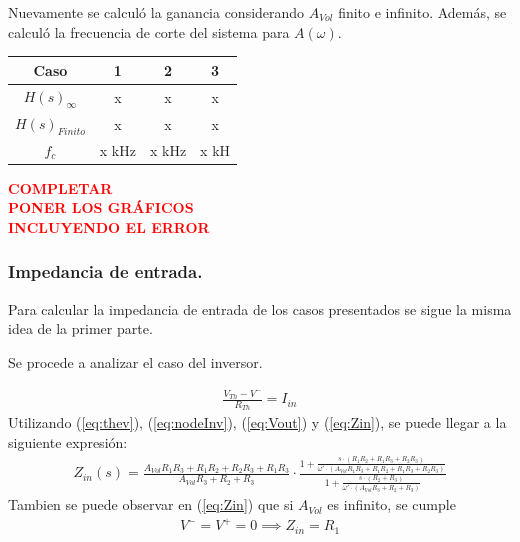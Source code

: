 Nuevamente se calculó la ganancia considerando $A_{Vol}$ finito e infinito. Además, se calculó la frecuencia de corte del sistema para $A(\omega)$.

\begin{table}[H]
\begin{center}
\begin{tabular}{|c|c|c|c|}
\hline
\textbf{Caso}            & \textbf{1} & \textbf{2} & \textbf{3} \\ \hline
\textbf{$H(s)_{\infty}$} & x         & x          & x        \\ \hline
\textbf{$H(s)_{Finito}$} & x     & x     & x     \\ \hline
\textbf{$f_c$}           & x kHz   & x kHz  & x kH     \\ \hline
\end{tabular}
\end{center}
\end{table}

\begin{center}
\textcolor{red}{\textbf{COMPLETAR}}\\
\textcolor{red}{\textbf{PONER LOS GRÁFICOS}}\\
\textcolor{red}{\textbf{INCLUYENDO EL ERROR}}
\end{center}

\subsubsection{Impedancia de entrada.}

Para calcular la impedancia de entrada de los casos presentados se sigue la misma idea de la primer parte.

Se procede a analizar el caso del inversor.

\begin{align}
\label{eq:Zin}
\frac{V_{Th} - V^-}{R_{Th}}=I_{in}
\end{align}
Utilizando (\ref{eq:thev}), (\ref{eq:nodeInv}), (\ref{eq:Vout}) y (\ref{eq:Zin}), se puede llegar a la siguiente expresión:
\begin{align}
	Z_{in}(s)=\frac{A_{Vol}R_1R_3+R_1R_2+R_2R_3+R_1R_3}{A_{Vol}R_3+R_2+R_3}\cdot \frac{1+\frac{s\cdot (R_1R_2+R_1R_3+R_2R_3)}{\omega ' \cdot (A_{Vol}R_1R_3+R_1R_2+R_1R_3+R_2R_3)}}{1+\frac{s\cdot (R_2+R_3)}{\omega ' \cdot(A_{Vol}R_3+R_2+R_3)}}
\end{align}
Tambien se puede observar en (\ref{eq:Zin}) que si $A_{Vol}$ es infinito, se cumple
\begin{align} V^- = V^+=0 \implies Z_{in}=R_1
\end{align}

